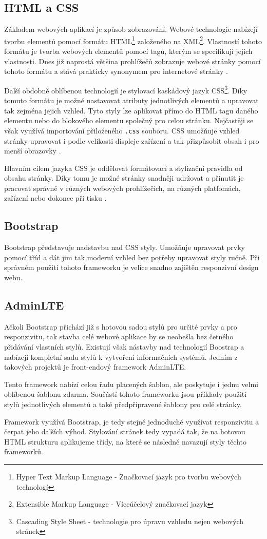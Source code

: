 \documentclass[czech,BP]{thesiskiv}
\begin{document}
	\subsection{HTML a CSS}
		\par Základem webových aplikací je způsob zobrazování. Webové technologie nabízejí tvorbu elementů pomocí formátu HTML\footnote{Hyper Text Markup Language - Značkovací jazyk pro tvorbu webových technologí} založeného na XML\footnote{Extensible Markup Language - Víceúčelový značkovací jazyk}. Vlastností tohoto formátu je tvorba webových elementů pomocí tagů, kterým se specifikují jejich vlastnosti. Dnes již naprostá většina prohlížečů zobrazuje webové stránky pomocí tohoto formátu a stává prakticky synonymem pro internetové stránky \cite{HTML5aCSS3}.
		\par Další obdobně oblíbenou technologií je stylovací kaskádový jazyk CSS\footnote{Cascading Style Sheet - technologie pro úpravu vzhledu nejen webových stránek}. Díky tomuto formátu je možné nastavovat atributy jednotlivých elementů a upravovat tak zejména jejich vzhled. Tyto styly lze aplikovat přímo do HTML tagu daného elementu nebo do blokového elementu společný pro celou stránku. Nejčastěji se však využívá importování přiloženého \texttt{.css} souboru. CSS umožňuje vzhled stránky upravovat i podle velikosti displeje zařízení a tak přizpůsobit obsah i pro menší obrazovky \cite{CSSOkamzite}.
		\par Hlavním cílem jazyka CSS je oddělovat formátovací a stylizační pravidla od obsahu stránky. Díky tomu je možné stránky snadněji udržovat a přinutit je pracovat správně v různých webových prohlížečích, na různých platfomách, zařízení nebo dokonce při tisku \cite{HTML5aCSS3}.
	\subsection{Bootstrap}
		\par Bootstrap představuje nadstavbu nad CSS styly. Umožňuje upravovat prvky pomocí tříd a dát jim tak moderní vzhled bez potřeby upravovat styly ručně. Při správném použití tohoto frameworku je velice snadno zajištěn responzivní design webu.
	\subsection{AdminLTE}
		Ačkoli Bootstrap přichází již s hotovou sadou stylů pro určité prvky a pro responzivitu, tak stavba celé webové aplikace by se neobešla bez četného přidávání vlastních stylů. Existují však nástavby nad technologií Boostrap a nabízejí kompletní sadu stylů k vytvoření informačních systémů. Jedním z takových projektů je front-endový framework AdminLTE. 
		\par Tento framework nabízí celou řadu placených šablon, ale poskytuje i jednu velmi oblíbenou šablonu zdarma. Součástí tohoto frameworku jsou příklady použití stylů jednotlivých elementů a také předpřipravené šablony pro celé stránky.
		\par Framework využívá Bootstrap, je tedy stejně jednoduché využívat responzivitu a čerpat jeho dalších výhod. Stylování stránek tedy vypadá tak, že na hotovou HTML strukturu aplikujeme třídy, na které se následně navazují styly těchto frameworků. 
\end{document}
